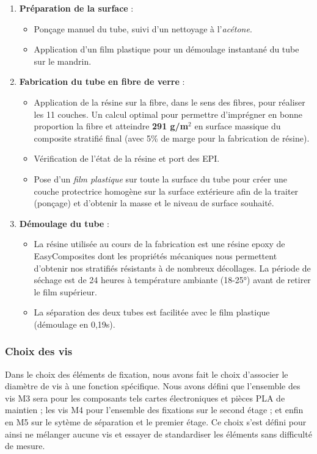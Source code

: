 \begin{enumerate}
    \item \textbf{Préparation de la surface} :
    \begin{itemize}
        \item Ponçage manuel du tube, suivi d'un nettoyage à l'\textit{acétone}.
        \item Application d'un film plastique pour un démoulage instantané du tube sur le mandrin.
    \end{itemize}
    \item \textbf{Fabrication du tube en fibre de verre} :
    \begin{itemize}
        \item Application de la résine sur la fibre, dans le sens des fibres, pour réaliser les 11 couches. Un calcul optimal
        pour permettre d'imprégner en bonne proportion la fibre et atteindre \textbf{291 g/m$^2$} en surface massique du
        composite stratifié final (avec 5\% de marge pour la fabrication de résine).
        \item Vérification de l'état de la résine et port des \acrfull{EPI}.
        \item Pose d'un \textit{film plastique} sur toute la surface du tube pour créer une couche protectrice homogène sur la
        surface extérieure afin de la traiter (ponçage) et d'obtenir la masse et le niveau de surface souhaité.
    \end{itemize}
    \item \textbf{Démoulage du tube} :
    \begin{itemize}
        \item La résine utilisée au cours de la fabrication est une résine epoxy de EasyComposites dont les propriétés mécaniques
        nous permettent d'obtenir nos stratifiés résistants à de nombreux décollages. La période de séchage est de 24 heures à
        température ambiante (18-25°) avant de retirer le film supérieur.
        \item La séparation des deux tubes est facilitée avec le film plastique (démoulage en 0,19s).
    \end{itemize}
\end{enumerate}

\subsubsection{Choix des vis}
Dans le choix des éléments de fixation, nous avons fait le choix d'associer le diamètre de vis à une fonction spécifique. Nous avons défini que l'ensemble des vis M3 sera pour les composants tels cartes électroniques et pièces PLA de maintien ; les vis M4 pour l'ensemble des fixations sur le second étage ; et enfin en M5 sur le sytème de séparation et le premier étage.
Ce choix s'est défini pour ainsi ne mélanger aucune vis et essayer de standardiser les éléments sans difficulté de mesure.


